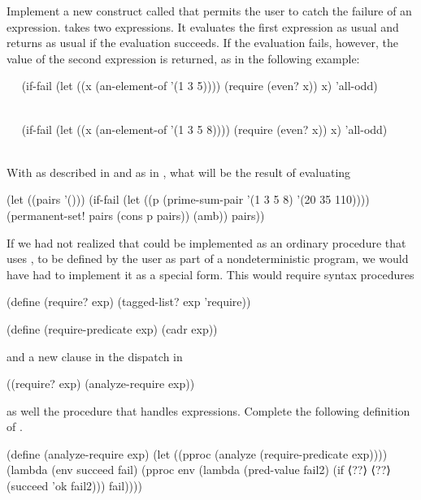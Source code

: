 \begin{exercise}
	\label{Exercise 4.52}
	Implement a new construct called  that permits the user to catch the failure of an expression.
	 takes two expressions.
	It evaluates the first expression as usual and returns as usual if the evaluation succeeds.
	If the evaluation fails, however, the value of the second expression is returned, as in the following example:
	\begin{scheme}
	  ~~
	  (if-fail (let ((x (an-element-of '(1 3 5))))
	             (require (even? x))
	             x)
	           'all-odd)
	  ~~
	  ~~
	  ~~

	  ~~
	  (if-fail (let ((x (an-element-of '(1 3 5 8))))
	             (require (even? x))
	             x)
	           'all-odd)
	  ~~
	  ~~
	  ~~
	\end{scheme}
\end{exercise}



\begin{exercise}
	\label{Exercise 4.53}
	With  as described in  and  as in , what will be the result of evaluating
	\begin{scheme}
	  (let ((pairs '()))
	    (if-fail
	     (let ((p (prime-sum-pair '(1 3 5 8)
	                              '(20 35 110))))
	       (permanent-set! pairs (cons p pairs))
	       (amb))
	     pairs))
	\end{scheme}
\end{exercise}



\begin{exercise}
	\label{Exercise 4.54}
	If we had not realized that  could be implemented as an ordinary procedure that uses , to be defined by the user as part of a nondeterministic program, we would have had to implement it as a special form.
	This would require syntax procedures
	\begin{scheme}
	  (define (require? exp)
	    (tagged-list? exp 'require))

	  (define (require-predicate exp)
	    (cadr exp))
	\end{scheme}
	and a new clause in the dispatch in \code{analyze}
	\begin{scheme}
	  ((require? exp) (analyze-require exp))
	\end{scheme}
	as well the procedure  that handles  expressions.
	Complete the following definition of \code{analyze-require}.
	\begin{scheme}
	  (define (analyze-require exp)
	    (let ((pproc (analyze (require-predicate exp))))
	      (lambda (env succeed fail)
	        (pproc env
	               (lambda (pred-value fail2)
	                 (if ⟨??⟩
	                     ⟨??⟩
	                     (succeed 'ok fail2)))
	               fail))))

	\end{scheme}
\end{exercise}

